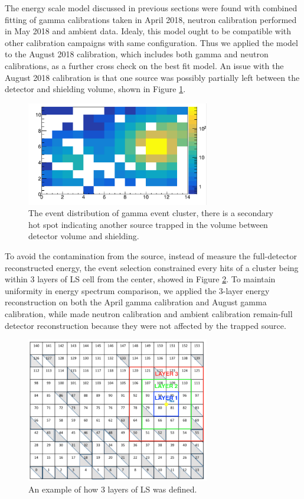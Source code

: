 The energy scale model discussed in previous sections were found with combined fitting of gamma calibrations taken in April 2018, neutron calibration performed in May 2018 and ambient data. 
Idealy, this model ought to be compatible with other calibration campaigns with same configuration. 
Thus we applied the model to the August 2018 calibration, which includes both gamma and neutron calibrations, as a further cross check on the best fit model.
An issue with the August 2018 calibration is that one source was possibly partially left between the detector and shielding volume, shown in Figure \ref{fig:left}.

\begin{figure}[h!]
\centering
\includegraphics[width=80mm]{Figures/secondhotspot.png}
\caption{The event distribution of gamma event cluster, there is a secondary hot spot indicating another source trapped in the volume between detector volume and shielding.}
\label{fig:left}
\end{figure}

To avoid the contamination from the source, instead of measure the full-detector reconstructed energy, the event selection constrained every hits of a cluster being within 3 layers of LS cell from the center, showed in Figure \ref{fig:ring}.
To maintain uniformity in energy spectrum comparison, we applied the 3-layer energy reconstruction on both the April gamma calibration and August gamma calibration, while made neutron calibration and ambient calibration remain-full detector reconstruction because they were not affected by the trapped source.

\begin{figure}[h!]
\centering
\includegraphics[width=80mm]{Figures/Ring.png}
\caption{An example of how 3 layers of LS was defined.}
\label{fig:ring}
\end{figure}

